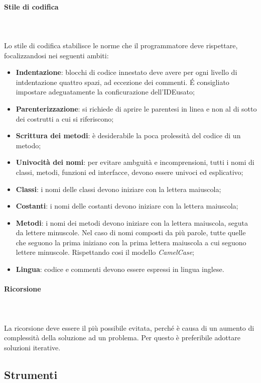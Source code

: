 		\paragraph{Stile di codifica} \mbox{} \\ \mbox{} \\
		Lo stile di codifica stabilisce le norme che il programmatore deve rispettare, focalizzandosi nei seguenti ambiti:
		\begin{itemize}
			\item \textbf{Indentazione}: blocchi di codice innestato deve avere per ogni livello di intdentazione quattro spazi, ad eccezione dei commenti. \'E consigliato impostare adeguatamente la conficurazione dell'IDE\glo usato;
			\item \textbf{Parenterizzazione}: si richiede di aprire le parentesi in linea e non al di sotto dei costrutti a cui si riferiscono;
			\item \textbf{Scrittura dei metodi}: è desiderabile la poca prolessità del codice di un metodo;
			\item \textbf{Univocità dei nomi}: per evitare ambguità e incomprensioni, tutti i nomi di classi, metodi, funzioni ed interfacce, devono essere univoci ed esplicativo;
			\item \textbf{Classi}: i nomi delle classi devono iniziare con la lettera maiuscola;
			\item \textbf{Costanti}: i nomi delle costanti devono iniziare con la lettera maiuscola;
			\item \textbf{Metodi}: i nomi dei metodi devono iniziare con la lettera maiuscola, seguta da lettere minuscole. Nel caso di nomi composti da più parole, tutte quelle che seguono la prima iniziano con la prima lettera maiuscola a cui seguono lettere minuscole. Rispettando cosi il modello \textit{CamelCase}\glo;
			\item \textbf{Lingua}: codice e commenti devono essere espressi in lingua inglese.
		\end{itemize}
		\paragraph{Ricorsione} \mbox{} \\ \mbox{} \\
		La ricorsione deve essere il più possibile evitata, perché è causa di un aumento di complessità della soluzione ad un problema. Per questo è preferibile adottare soluzioni iterative.
	\subsection{Strumenti}
